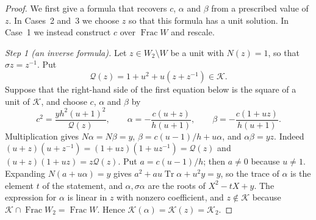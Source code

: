 \documentclass[11pt]{article}
\theoremstyle{plain}
\theoremstyle{definition}
\theoremstyle{remark}
\DeclareMathOperator{\Frac}{Frac}
\begin{document}
\begin{proof}
We first give a formula that recovers $c$, $\alpha$ and $\beta$ from a
prescribed value of $z$.  In Cases~2 and~3 we choose $z$ so that this
formula has a unit solution.  In Case~1 we instead construct $c$ over
$\Frac W$ and rescale.

\emph{Step 1 (an inverse formula).}  Let $z\in W_2\setminus W$ be a
unit with $N(z)=1$, so that $\sigma z=z^{-1}$.  Put
\[
 \mathcal Q(z)=1+u^2+u(z+z^{-1})\in\mathcal K.
\]
Suppose that the right-hand side of the first equation below is the
square of a unit of $\mathcal K$, and choose $c$, $\alpha$ and $\beta$
by
\begin{equation}\label{eq:coefficient-inverse}
 c^2=\frac{yh^2(u+1)^2}{\mathcal Q(z)},\qquad
 \alpha=-\frac{c(u+z)}{h(u+1)},\qquad
 \beta=-\frac{c(1+uz)}{h(u+1)}.
\end{equation}
Multiplication gives $N\alpha=N\beta=y$,
$\beta=c(u-1)/h+u\alpha$, and $\alpha\beta=yz$.  Indeed
$(u+z)(u+z^{-1})=(1+uz)(1+uz^{-1})=\mathcal Q(z)$ and
$(u+z)(1+uz)=z\mathcal Q(z)$.  Put $a=c(u-1)/h$; then $a\ne0$ because
$u\ne1$.  Expanding $N(a+u\alpha)=y$ gives
$a^2+au\operatorname{Tr}\alpha+u^2y=y$, so the trace of $\alpha$ is the
element $t$ of the statement, and $\alpha,\sigma\alpha$ are the roots of
$X^2-tX+y$.  The expression for $\alpha$ is linear in $z$ with nonzero
coefficient, and $z\notin\mathcal K$ because
$\mathcal K\cap\Frac W_2=\Frac W$.  Hence
$\mathcal K(\alpha)=\mathcal K(z)=\mathcal K_2$.


\end{proof}
\end{document}
